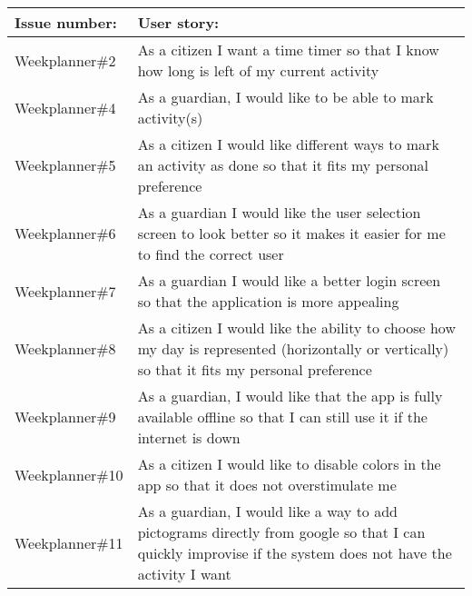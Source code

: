 \begin{longtable}{|p{}|p{}|}
    \hline
    Issue number:   & User story:                                                                                                                                                                                  \\ \hline
    Weekplanner\#2  & As a citizen I want a time timer so that I know how long is left of my current activity                                                                                                      \\ \hline
    Weekplanner\#4  & As a guardian, I would like to be able to mark activity(s)                                                                                                                                   \\ \hline
    Weekplanner\#5  & As a citizen I would like different ways to mark an activity as done so that it fits my personal preference                                                                                  \\ \hline
    Weekplanner\#6  & As a guardian I would like the user selection screen to look better so it makes it easier for me to find the correct user                                                                    \\ \hline
    Weekplanner\#7  & As a guardian I would like a better login screen so that the application is more appealing                                                                                                   \\ \hline
    Weekplanner\#8  & As a citizen I would like the ability to choose how my day is represented (horizontally or vertically) so that it fits my personal preference                                                \\ \hline
    Weekplanner\#9  & As a guardian, I would like that the app is fully available offline so that I can still use it if the internet is down                                                                       \\ \hline
    Weekplanner\#10 & As a citizen I would like to disable colors in the app so that it does not overstimulate me                                                                                                  \\ \hline
    Weekplanner\#11 & As a guardian, I would like a way to add pictograms directly from google so that I can quickly improvise if the system does not have the activity I want                                     \\ \hline

\end{longtable}
